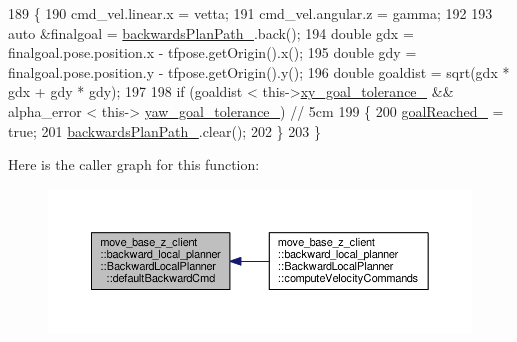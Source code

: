 \begin{DoxyCode}
189 \{
190     cmd\_vel.linear.x = vetta;
191     cmd\_vel.angular.z = gamma;
192 
193     \textcolor{keyword}{auto} &finalgoal = \hyperlink{classmove__base__z__client_1_1backward__local__planner_1_1BackwardLocalPlanner_a451add2af7d6d83a7415277311b3ed04}{backwardsPlanPath\_}.back();
194     \textcolor{keywordtype}{double} gdx = finalgoal.pose.position.x - tfpose.getOrigin().x();
195     \textcolor{keywordtype}{double} gdy = finalgoal.pose.position.y - tfpose.getOrigin().y();
196     \textcolor{keywordtype}{double} goaldist = sqrt(gdx * gdx + gdy * gdy);
197 
198     \textcolor{keywordflow}{if} (goaldist < this->\hyperlink{classmove__base__z__client_1_1backward__local__planner_1_1BackwardLocalPlanner_a89ab1ee7283a474dc19970789f51c087}{xy\_goal\_tolerance\_} && alpha\_error < this->
      \hyperlink{classmove__base__z__client_1_1backward__local__planner_1_1BackwardLocalPlanner_a10d15842054d518159baa535afe6f1fd}{yaw\_goal\_tolerance\_}) \textcolor{comment}{// 5cm}
199     \{
200         \hyperlink{classmove__base__z__client_1_1backward__local__planner_1_1BackwardLocalPlanner_a0a89141d3d3a8ebfb9e1d69d0d33fd49}{goalReached\_} = \textcolor{keyword}{true};
201         \hyperlink{classmove__base__z__client_1_1backward__local__planner_1_1BackwardLocalPlanner_a451add2af7d6d83a7415277311b3ed04}{backwardsPlanPath\_}.clear();
202     \}
203 \}
\end{DoxyCode}


Here is the caller graph for this function\+:\nopagebreak
\begin{figure}[H]
\begin{center}
\leavevmode
\includegraphics[width=350pt]{classmove__base__z__client_1_1backward__local__planner_1_1BackwardLocalPlanner_a9f3977494d5f80884eb1a1d09b5b4673_icgraph}
\end{center}
\end{figure}


